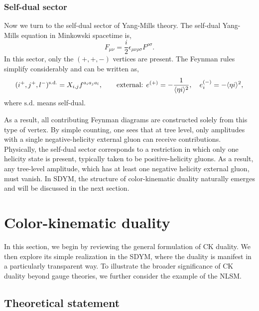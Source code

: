 \documentclass[a4paper,11pt]{article}
\begin{document}
\subsubsection{Self-dual sector}
Now we turn to the self-dual sector of Yang-Mills theory. The self-dual Yang-Mills equation in Minkowski spacetime is,
\begin{equation}
    F_{\mu \nu}=\frac{i}{2}\epsilon_{\mu \nu \rho \sigma}F^{\rho \sigma}.
\end{equation}
In this sector, only the $(+,+,-)$ vertices are present. The Feynman rules simplify considerably and can be written as,
\begin{equation}\label{sd-f}
(i^+,j^+,l^-)^{\text{s.d.}}=X_{i,j}f^{a_i a_j a_l},\qquad \text{external: } e^{(+)}=-\frac{1}{\langle \eta i \rangle^2}, \quad e^{(-)}_i=-\langle \eta i \rangle^2,
\end{equation}
where $\text{s.d.}$ means self-dual.\par
As a result, all contributing Feynman diagrams are constructed solely from this type of vertex. 
By simple counting, one sees that at tree level, only amplitudes with a single negative-helicity external gluon can receive contributions. 
Physically, the self-dual sector corresponds to a restriction in which only one helicity state is present, typically taken to be positive-helicity gluons.
As a result, any tree-level amplitude, which has at least one negative helicity external gluon, must vanish.
In SDYM, the structure of color-kinematic duality naturally emerges and will be discussed in the next section.\par


\section{Color-kinematic duality}
In this section, we begin by reviewing the general formulation of CK duality. 
We then explore its simple realization in the SDYM, where the duality is manifest in a particularly transparent way.
To illustrate the broader significance of CK duality beyond gauge theories, we further consider the example of the NLSM.
\subsection{Theoretical statement}
\end{document}
